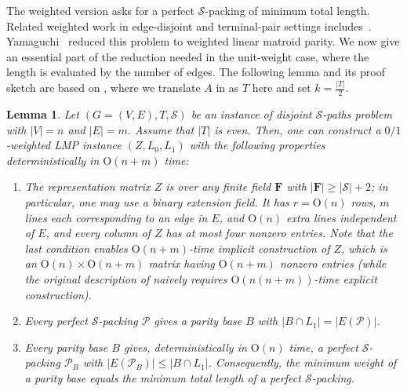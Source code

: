 \documentclass[11pt, a4paper]{article}
\theoremstyle{plain}
\newtheorem{lemma}[theorem]{Lemma}
\theoremstyle{definition}
\theoremstyle{remark}
\newcommand{\cS}{\mathcal{S}}
\newcommand{\bF}{\mathbf{F}}
\begin{document}
The weighted version asks for a perfect $\cS$-packing of minimum total length.
Related weighted work in edge-disjoint and terminal-pair settings includes~\cite{Karzanov1993,Karzanov1997,HP2014}.
Yamaguchi~\cite{Yamaguchi2016} reduced this problem to weighted linear matroid parity.
We now give an essential part of the reduction needed in the unit-weight case, where the length is evaluated by the number of edges.
The following lemma and its proof sketch are based on \cite[Section~2]{Yamaguchi2016}, where we translate $A$ in \cite{Yamaguchi2016} as $T$ here and set $k = \frac{|T|}{2}$.

\begin{lemma}\label{lem:reduction}
Let $(G=(V,E), T, \cS)$ be an instance of disjoint $\cS$-paths problem with $|V| = n$ and $|E| = m$.
Assume that $|T|$ is even.
Then, one can construct a $0/1$-weighted LMP instance $(Z,L_0,L_1)$ with the following properties deterministically in $\mathrm{O}(n + m)$ time:
\begin{enumerate}
\setlength{\itemsep}{0.5mm}
\item The representation matrix $Z$ is over any finite field $\bF$ with $|\bF| \ge |\cS|+2$; in particular, one may use a binary extension field.
It has $r=\mathrm{O}(n)$ rows, $m$ lines each corresponding to an edge in $E$, and $\mathrm{O}(n)$ extra lines independent of $E$, and every column of $Z$ has at most four nonzero entries.
Note that the last condition enables $\mathrm{O}(n + m)$-time implicit construction of $Z$, which is an $\mathrm{O}(n) \times \mathrm{O}(n + m)$ matrix having $\mathrm{O}(n + m)$ nonzero entries (while the original description of \cite{Yamaguchi2016} naively requires $\mathrm{O}(n(n + m))$-time explicit construction).
\item Every perfect $\cS$-packing $\mathcal{P}$ gives a parity base $B$ with $|B \cap L_1| = |E(\mathcal{P})|$.
\item Every parity base $B$ gives, deterministically in $\mathrm{O}(n)$ time, a perfect $\cS$-packing $\mathcal{P}_B$ with $|E(\mathcal{P}_B)|\le |B \cap L_1|$.
Consequently, the minimum weight of a parity base equals the minimum total length of a perfect $\cS$-packing.
\end{enumerate}
\end{lemma}
\end{document}
